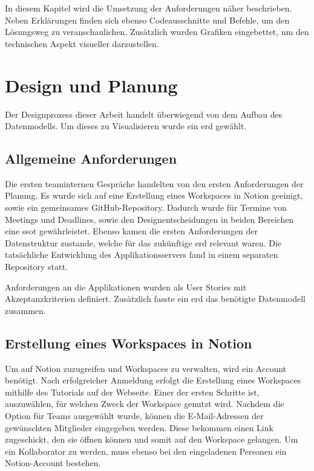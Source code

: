 In diesem Kapitel wird die Umsetzung der Anforderungen näher beschrieben. 
Neben Erklärungen finden sich ebenso Codeausschnitte und Befehle, um den Lösungsweg zu veranschaulichen.
Zusätzlich wurden Grafiken eingebettet, um den technischen Aspekt visueller darzustellen.

\section{Design und Planung}

Der Designprozess dieser Arbeit handelt überwiegend von dem Aufbau des Datenmodells. 
Um dieses zu Visualisieren wurde ein \gls{erd} gewählt.

\subsection{Allgemeine Anforderungen}
Die ersten teaminternen Gespräche handelten von den ersten Anforderungen der Planung. 
Es wurde sich auf eine Erstellung eines Workspaces in Notion geeinigt, sowie ein gemeinsames GitHub-Repository. 
Dadurch wurde für Termine von Meetings und Deadlines, sowie den Designentscheidungen in beiden Bereichen eine \gls{ssot} gewährleistet.
Ebenso kamen die ersten Anforderungen der Datenstruktur zustande, welche für das zukünftige \gls{erd} relevant waren.
Die tatsächliche Entwicklung des Applikationsservers fand in einem separaten Repository statt. 

Anforderungen an die Applikationen wurden als User Stories mit Akzeptanzkriterien definiert. 
Zusätzlich fasste ein \gls{erd} das benötigte Datenmodell zusammen.

\subsection{Erstellung eines Workspaces in Notion}

Um auf Notion zuzugreifen und Workspaces zu verwalten, wird ein Account benötigt. 
Nach erfolgreicher Anmeldung erfolgt die Erstellung eines Workspaces mithilfe des Tutorials auf der Webseite. 
Einer der ersten Schritte ist, auszuwählen, für welchen Zweck der Workspace genutzt wird. 
Nachdem die Option für Teams ausgewählt wurde, können die E-Mail-Adressen der gewünschten Mitglieder eingegeben werden. 
Diese bekommen einen Link zugeschickt, den sie öffnen können und somit auf den Workspace gelangen. 
Um ein Kollaborator zu werden, muss ebenso bei den eingeladenen Personen ein Notion-Account bestehen.


